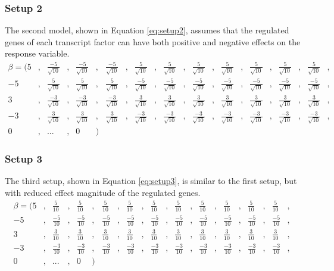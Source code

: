 \subsubsection{Setup 2}
The second model, shown in Equation \ref{eq:setup2}, assumes that the regulated genes of each transcript factor can have both positive and negative effects on the response variable.
\begin{equation} \label{eq:setup2} 
\begin{aligned}
\beta = (	5&,& \frac{-5}{\sqrt{10}}&,&  \frac{-5}{\sqrt{10}}&,&  \frac{-5}{\sqrt{10}}&,&  \frac{5}{\sqrt{10}}&,&  \frac{5}{\sqrt{10}}&,&  \frac{5}{\sqrt{10}}&,&  \frac{5}{\sqrt{10}}&,&  \frac{5}{\sqrt{10}}&,&  \frac{5}{\sqrt{10}}&,&  \frac{5}{\sqrt{10}}&,& \\
-5&,& \frac{5}{\sqrt{10}}&,&  \frac{5}{\sqrt{10}}&,&  \frac{5}{\sqrt{10}}&,&  \frac{-5}{\sqrt{10}}&,&  \frac{-5}{\sqrt{10}}&,&  \frac{-5}{\sqrt{10}}&,&  \frac{-5}{\sqrt{10}}&,&  \frac{-5}{\sqrt{10}}&,&  \frac{-5}{\sqrt{10}}&,&  \frac{-5}{\sqrt{10}}&,& \\
3&,& \frac{-3}{\sqrt{10}}&,&  \frac{-3}{\sqrt{10}}&,&  \frac{-3}{\sqrt{10}}&,&  \frac{3}{\sqrt{10}}&,&  \frac{3}{\sqrt{10}}&,&  \frac{3}{\sqrt{10}}&,&  \frac{3}{\sqrt{10}}&,&  \frac{3}{\sqrt{10}}&,&  \frac{3}{\sqrt{10}}&,&  \frac{3}{\sqrt{10}}&,& \\
-3&,& \frac{3}{\sqrt{10}}&,&  \frac{3}{\sqrt{10}}&,&  \frac{3}{\sqrt{10}}&,&  \frac{-3}{\sqrt{10}}&,&  \frac{-3}{\sqrt{10}}&,&  \frac{-3}{\sqrt{10}}&,&  \frac{-3}{\sqrt{10}}&,&  \frac{-3}{\sqrt{10}}&,&  \frac{-3}{\sqrt{10}}&,&  \frac{-3}{\sqrt{10}}&,& \\
0&,& ...&,& 0&)&
\end{aligned}
\end{equation}

\subsubsection{Setup 3}
The third setup, shown in Equation \ref{eq:setup3}, is similar to the first setup, but with reduced effect magnitude of the regulated genes. 
\begin{equation} \label{eq:setup3} 
\begin{aligned}
\beta = (	5&,& \frac{5}{10}&,&  \frac{5}{10}&,&  \frac{5}{10}&,&  \frac{5}{10}&,&  \frac{5}{10}&,&  \frac{5}{10}&,&  \frac{5}{10}&,&  \frac{5}{10}&,&  \frac{5}{10}&,&  \frac{5}{10}&,& \\
-5&,& \frac{-5}{10}&,&  \frac{-5}{10}&,&  \frac{-5}{10}&,&  \frac{-5}{10}&,&  \frac{-5}{10}&,&  \frac{-5}{10}&,&  \frac{-5}{10}&,&  \frac{-5}{10}&,&  \frac{-5}{10}&,&  \frac{-5}{10}&,& \\
3&,& \frac{3}{10}&,&  \frac{3}{10}&,&  \frac{3}{10}&,&  \frac{3}{10}&,&  \frac{3}{10}&,&  \frac{3}{10}&,&  \frac{3}{10}&,&  \frac{3}{10}&,&  \frac{3}{10}&,&  \frac{3}{10}&,& \\
-3&,& \frac{-3}{10}&,&  \frac{-3}{10}&,&  \frac{-3}{10}&,&  \frac{-3}{10}&,&  \frac{-3}{10}&,&  \frac{-3}{10}&,&  \frac{-3}{10}&,&  \frac{-3}{10}&,&  \frac{-3}{10}&,&  \frac{-3}{10}&,& \\
0&,& ...&,& 0&)&
\end{aligned}
\end{equation}


